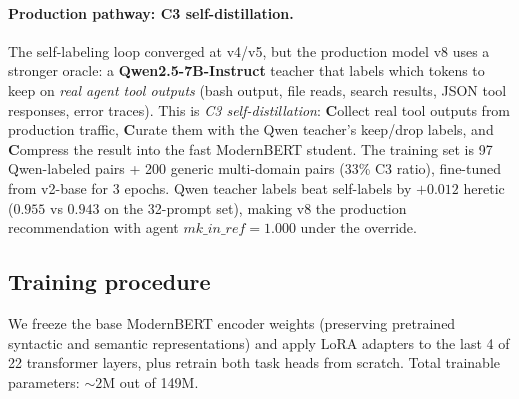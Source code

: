 \paragraph{Production pathway: C3 self-distillation.} The self-labeling loop
converged at v4/v5, but the production model v8 uses a stronger oracle: a
\textbf{Qwen2.5-7B-Instruct} teacher that labels which tokens to keep on
\emph{real agent tool outputs} (bash output, file reads, search results, JSON
tool responses, error traces). This is \emph{C3 self-distillation}:
\textbf{C}ollect real tool outputs from production traffic,
\textbf{C}urate them with the Qwen teacher's keep/drop labels, and
\textbf{C}ompress the result into the fast ModernBERT student. The training
set is 97 Qwen-labeled pairs + 200 generic multi-domain pairs (33\% C3
ratio), fine-tuned from v2-base for 3 epochs. Qwen teacher labels beat
self-labels by $+0.012$ heretic ($0.955$ vs $0.943$ on the 32-prompt set),
making v8 the production recommendation with agent
$\mathit{mk\_in\_ref}{=}1.000$ under the override.

\subsection{Training procedure}
\label{sec:train}

We freeze the base ModernBERT encoder weights (preserving pretrained syntactic
and semantic representations) and apply LoRA adapters to the last 4 of 22
transformer layers, plus retrain both task heads from scratch. Total trainable
parameters: ${\sim}2$M out of 149M.

